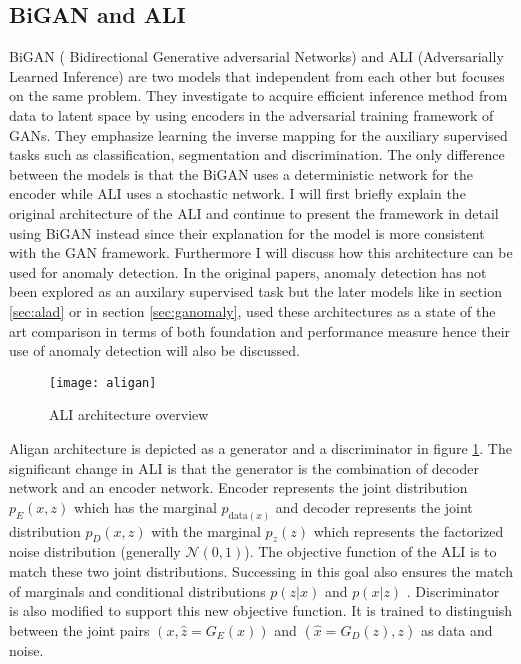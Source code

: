 \subsection{BiGAN and ALI}
\label{sec:bigan}

 BiGAN ( Bidirectional Generative adversarial Networks) \cite{Donahue2017AdversarialFL} and ALI
 (Adversarially Learned Inference) \cite{Dumoulin2017AdversariallyLI} are two models that
 independent from each other but focuses on the same problem. They investigate to acquire efficient
 inference method from data to latent space by using encoders in the adversarial training framework
 of GANs. They emphasize learning the inverse mapping for the auxiliary supervised tasks such as
 classification, segmentation and discrimination. The only difference between the models is that the
 BiGAN uses a deterministic network for the encoder while ALI uses a stochastic network. I will
 first briefly explain the original architecture of the ALI and continue to present the framework in
 detail using BiGAN instead since their explanation for the model is more consistent with the GAN
 framework. Furthermore I will discuss how this architecture can be used for anomaly detection. In
 the original papers, anomaly detection has not been explored as an auxilary supervised task but the
 later models like in section \ref{sec:alad} or in section \ref{sec:ganomaly}, used these
 architectures as a state of the art comparison in terms of both foundation and performance measure
 hence their use of anomaly detection will also be discussed.

\begin{figure}[h!]
	\centering
	\texttt{[image: aligan]}
    \caption{ALI architecture overview}
    \label{fig:aligan_model}
\end{figure}

Aligan architecture is depicted as a generator and a discriminator in figure \ref{fig:aligan_model}.
The significant change in ALI is that the generator is the combination of decoder network and an
encoder network. Encoder represents the joint distribution $p_{E}(x, z)$ which has the marginal
$p_{\text{data}(x)}$ and decoder represents the joint distribution $p_{D}(x, z)$ with the marginal
$p_z(z)$ which represents the factorized noise distribution (generally $\mathcal{N}(0, 1)$). The
objective function of the ALI is to match these two joint distributions. Successing in this goal
also ensures the match of marginals and conditional distributions $p(z | x)$ and $p(x | z)$
. Discriminator is also modified to support this new objective function. It is trained to
distinguish between the joint pairs  $(x, \hat{z} = G_{E}(x))$ and $(\hat{x} = G_{D}(z), z)$ as data
and noise.

